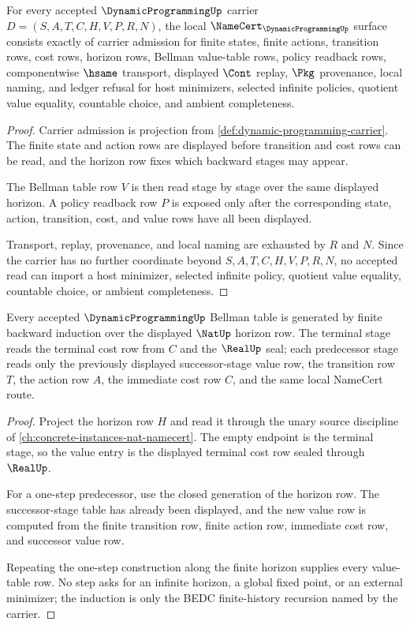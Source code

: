 \begin{theorem}
\label{thm:dynamic-programming-bellman-obligations}
For every accepted $\DynamicProgrammingUp$ carrier $D=(S,A,T,C,H,V,P,R,N)$, the local $\NameCert_{\DynamicProgrammingUp}$ surface consists exactly of carrier admission for finite states, finite actions, transition rows, cost rows, horizon rows, Bellman value-table rows, policy readback rows, componentwise $\hsame$ transport, displayed $\Cont$ replay, $\Pkg$ provenance, local naming, and ledger refusal for host minimizers, selected infinite policies, quotient value equality, countable choice, and ambient completeness.
\end{theorem}
\begin{proof}
Carrier admission is projection from \autoref{def:dynamic-programming-carrier}. The finite state and action rows are displayed before transition and cost rows can be read, and the horizon row fixes which backward stages may appear.

The Bellman table row $V$ is then read stage by stage over the same displayed horizon. A policy readback row $P$ is exposed only after the corresponding state, action, transition, cost, and value rows have all been displayed.

Transport, replay, provenance, and local naming are exhausted by $R$ and $N$. Since the carrier has no further coordinate beyond $S,A,T,C,H,V,P,R,N$, no accepted read can import a host minimizer, selected infinite policy, quotient value equality, countable choice, or ambient completeness.
\end{proof}

\begin{theorem}
\label{thm:dynamic-programming-finite-horizon-induction}
Every accepted $\DynamicProgrammingUp$ Bellman table is generated by finite backward induction over the displayed $\NatUp$ horizon row. The terminal stage reads the terminal cost row from $C$ and the $\RealUp$ seal; each predecessor stage reads only the previously displayed successor-stage value row, the transition row $T$, the action row $A$, the immediate cost row $C$, and the same local NameCert route.
\end{theorem}
\begin{proof}
Project the horizon row $H$ and read it through the unary source discipline of \autoref{ch:concrete-instances-nat-namecert}. The empty endpoint is the terminal stage, so the value entry is the displayed terminal cost row sealed through $\RealUp$.

For a one-step predecessor, use the closed generation of the horizon row. The successor-stage table has already been displayed, and the new value row is computed from the finite transition row, finite action row, immediate cost row, and successor value row.

Repeating the one-step construction along the finite horizon supplies every value-table row. No step asks for an infinite horizon, a global fixed point, or an external minimizer; the induction is only the BEDC finite-history recursion named by the carrier.
\end{proof}

